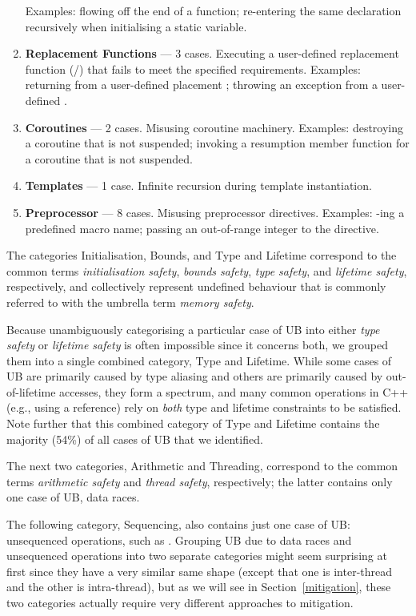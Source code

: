 \begin{enumerate}
Examples: flowing off the end of a function; re-entering the same declaration recursively when initialising a static variable.
\item \textbf{Replacement Functions} --- 3 cases. Executing a user-defined replacement function (/) that fails to meet the specified requirements. Examples: returning  from a user-defined placement ; throwing an exception from a user-defined .
\item \textbf{Coroutines} --- 2 cases. Misusing coroutine machinery. Examples: destroying a coroutine that is not suspended; invoking a resumption member function for a coroutine that is not suspended.
\item \textbf{Templates} --- 1 case. Infinite recursion during template instantiation. %
\item \textbf{Preprocessor} --- 8 cases. Misusing preprocessor directives. Examples: -ing a predefined macro name; passing an out-of-range integer to the  directive.
\end{enumerate}

The categories Initialisation, Bounds, and Type and Lifetime correspond to the common terms \emph{initialisation safety}, \emph{bounds safety}, \emph{type safety},  and \emph{lifetime safety}, respectively, and collectively represent undefined behaviour that is commonly referred to with the umbrella term \emph{memory safety}.

Because unambiguously categorising a particular case of UB into either \emph{type safety} or \emph{lifetime safety} is often impossible since it concerns both, we grouped them into a single combined category, Type and Lifetime. While some cases of UB are primarily caused by type aliasing and others are primarily caused by out-of-lifetime accesses, they form a spectrum, and many common operations in C++ (e.g., using a reference) rely on \emph{both} type and lifetime constraints to be satisfied. Note further that this combined category of Type and Lifetime contains the majority (54\%) of all cases of UB that we identified. %

The next two categories, Arithmetic and Threading, correspond to the common terms \emph{arithmetic safety} and \emph{thread safety}, respectively; the latter contains only one case of UB, data races.

The following category, Sequencing, also contains just one case of UB: unsequenced operations, such as \mbox{}. Grouping UB due to data races and unsequenced operations into two separate categories might seem surprising at first since they have a very similar same shape (except that one is inter-thread and the other is intra-thread), but as we will see in Section~\ref{mitigation}, these two categories actually require very different approaches to mitigation.

